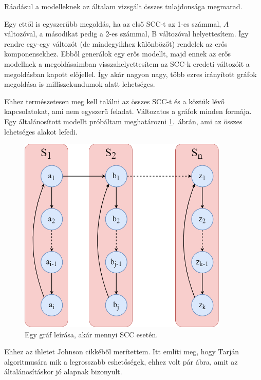 \documentclass[
]{thesis-ekf}
\theoremstyle{definition}
\theoremstyle{remark}
\begin{document}
	Ráadásul a modelleknek az általam vizsgált összes tulajdonsága megmarad.
	
	Egy ettől is egyszerűbb megoldás, ha az első \textsc{SCC}-t az 1-es számmal, $ A $ változóval, a másodikat pedig a 2-es számmal, B változóval helyettesítem. Így rendre egy-egy változót (de mindegyikhez különbözőt) rendelek az erős komponensekhez. Ebből generálok egy erős modellt, majd ennek az erős modellnek a megoldásaimban visszahelyettesítem az \textsc{SCC}-k eredeti változóit a megoldásban kapott előjellel. Így akár nagyon nagy, több ezres irányított gráfok megoldása is milliszekundumok alatt lehetséges.
	\newpage
	
	Ehhez természetesen meg kell találni az összes \textsc{SCC}-t és a köztük lévő kapcsolatokat, ami nem egyszerű feladat. Változatos a gráfok minden formája. Egy általánosított modellt próbáltam meghatározni \ref{abra-sajatpelda-altalanos}.~ábrán, ami az összes lehetséges alakot lefedi.
	
	\begin{figure}[!ht]
		\centering
		\includegraphics[width=10cm]{images/sajat_pelda-altalanos}
		\caption{Egy gráf leírása, akár mennyi \textsc{SCC} esetén.}
		\label{abra-sajatpelda-altalanos}
	\end{figure}	

	Ehhez az ihletet Johnson cikkéből \cite{johnson} merítettem. Itt említi meg, hogy Tarján algoritmusára \cite{tarjan} mik a legrosszabb eshetőségek, ehhez volt pár ábra, amit az általánosításkor jó alapnak bizonyult.
\end{document}
